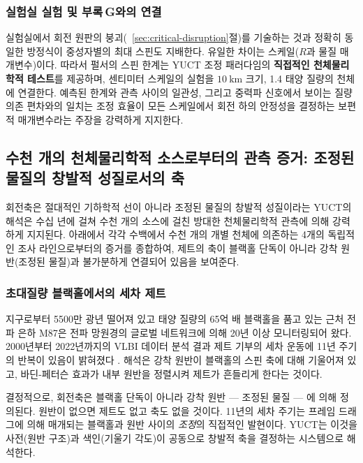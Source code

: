 \documentclass[12pt,a4paper]{article}
\begin{document}
	\subsubsection{실험실 실험 및 부록 G와의 연결}
	
	실험실에서 회전 원판의 붕괴(~\ref{sec:critical-disruption}절)를 기술하는 것과 정확히 동일한 방정식이 중성자별의 최대 스핀도 지배한다. 유일한 차이는 스케일(\(R\)과 물질 매개변수)이다. 따라서 펄서의 스핀 한계는 YUCT 조정 패러다임의 \textbf{직접적인 천체물리학적 테스트}를 제공하며, 센티미터 스케일의 실험을 \(10\ \text{km}\) 크기, 1.4 태양 질량의 천체에 연결한다. 예측된 한계와 관측 사이의 일관성, 그리고 중력파 신호에서 보이는 질량 의존 편차와의 일치는 조정 효율이 모든 스케일에서 회전 하의 안정성을 결정하는 보편적 매개변수라는 주장을 강력하게 지지한다.
	
	\subsection{수천 개의 천체물리학적 소스로부터의 관측 증거: 조정된 물질의 창발적 성질로서의 축}
	
	회전축은 절대적인 기하학적 선이 아니라 조정된 물질의 창발적 성질이라는 YUCT의 해석은 수십 년에 걸쳐 수천 개의 소스에 걸친 방대한 천체물리학적 관측에 의해 강력하게 지지된다. 아래에서 각각 수백에서 수천 개의 개별 천체에 의존하는 4개의 독립적인 조사 라인으로부터의 증거를 종합하여, 제트의 축이 블랙홀 단독이 아니라 강착 원반(조정된 물질)과 불가분하게 연결되어 있음을 보여준다.
	
	\subsubsection{초대질량 블랙홀에서의 세차 제트}
	
	지구로부터 5500만 광년 떨어져 있고 태양 질량의 65억 배 블랙홀을 품고 있는 근처 전파 은하 M87은 전파 망원경의 글로벌 네트워크에 의해 20년 이상 모니터링되어 왔다. 2000년부터 2022년까지의 VLBI 데이터 분석 결과 제트 기부의 세차 운동에 11년 주기의 반복이 있음이 밝혀졌다 \cite{M87Precession2024}. 해석은 강착 원반이 블랙홀의 스핀 축에 대해 기울어져 있고, 바딘-페터슨 효과가 내부 원반을 정렬시켜 제트가 흔들리게 한다는 것이다.
	
	결정적으로, 회전축은 블랙홀 단독이 아니라 강착 원반 — 조정된 물질 — 에 의해 정의된다. 원반이 없으면 제트도 없고 축도 없을 것이다. 11년의 세차 주기는 프레임 드래그에 의해 매개되는 블랙홀과 원반 사이의 \emph{조정}의 직접적인 발현이다. YUCT는 이것을 사전(원반 구조)과 색인(기울기 각도)이 공동으로 창발적 축을 결정하는 시스템으로 해석한다.
	
\end{document}
